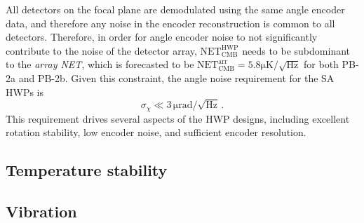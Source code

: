 All detectors on the focal plane are demodulated using the same angle encoder data, and therefore any noise in the encoder reconstruction is common to all detectors. Therefore, in order for angle encoder noise to not significantly contribute to the noise of the detector array, $\mathrm{NET_{CMB}^{HWP}}$ needs to be subdominant to the \textit{array NET}, which is forecasted to be $\mathrm{NET_{CMB}^{arr}} = 5.8 \mathrm{\mu K / \sqrt{Hz}}$ for both PB-2a and PB-2b. Given this constraint, the angle noise requirement for the SA HWPs is
\begin{equation}
    \sigma_{\chi} \ll 3 \, \mathrm{\mu rad / \sqrt{Hz}} \, .
\end{equation}
This requirement drives several aspects of the HWP designs, including excellent rotation stability, low encoder noise, and sufficient encoder resolution.


\subsection{Temperature stability}
\label{sec:sa_hwp_requirement_temperature_stability}


\subsection{Vibration}
\label{sec:sa_hwp_requirement_temperature_stability}

